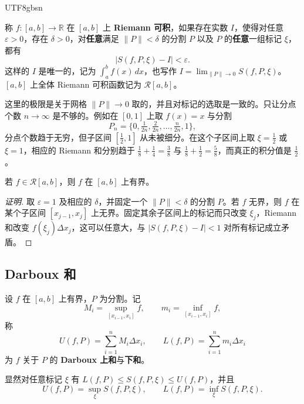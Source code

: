 \documentclass[11pt]{article}
\makeatletter
\newcommand{\envlabel}[1]{\protected@edef\@currentlabel{\themathenv}\label{#1}}
\makeatother
\begin{document}
\begin{CJK*}{UTF8}{gbsn}
\begin{definition}[Riemann 可积]
称 $f:[a,b]\to\mathbb{R}$ 在 $[a,b]$ 上 \textbf{Riemann 可积}，如果存在实数 $I$，使得对任意 $\varepsilon>0$，存在 $\delta>0$，对\textbf{任意}满足 $\|P\|<\delta$ 的分割 $P$ 以及 $P$ 的\textbf{任意}一组标记 $\xi$，都有
\[
|S(f,P,\xi)-I|<\varepsilon.
\]
这样的 $I$ 是唯一的，记为 $\displaystyle\int_{a}^{b}f(x)\,dx$，也写作 $\displaystyle I=\lim_{\|P\|\to0}S(f,P,\xi)$。$[a,b]$ 上全体 Riemann 可积函数记为 $\mathcal{R}[a,b]$。
\end{definition}

\begin{remark}
这里的极限是关于网格 $\|P\|\to0$ 取的，并且对标记的选取是一致的。只让分点个数 $n\to\infty$ 是不够的。例如在 $[0,1]$ 上取 $f(x)=x$ 与分割
\[
P_{n}=\Big\{0,\tfrac{1}{2n},\tfrac{2}{2n},\ldots,\tfrac{n}{2n},1\Big\},
\]
分点个数趋于无穷，但子区间 $[\tfrac12,1]$ 从未被细分。在这个子区间上取 $\xi=\tfrac12$ 或 $\xi=1$，相应的 Riemann 和分别趋于 $\tfrac18+\tfrac14=\tfrac38$ 与 $\tfrac18+\tfrac12=\tfrac58$，而真正的积分值是 $\tfrac12$。
\end{remark}

\begin{proposition}\envlabel{zh:prop:bdd}
若 $f\in\mathcal{R}[a,b]$，则 $f$ 在 $[a,b]$ 上有界。
\end{proposition}

\begin{proof}[证明]
取 $\varepsilon=1$ 及相应的 $\delta$，并固定一个 $\|P\|<\delta$ 的分割 $P$。若 $f$ 无界，则 $f$ 在某个子区间 $[x_{j-1},x_{j}]$ 上无界。固定其余子区间上的标记而只改变 $\xi_{j}$，Riemann 和改变 $f(\xi_{j})\Delta x_{j}$，这可以任意大，与 $|S(f,P,\xi)-I|<1$ 对所有标记成立矛盾。
\end{proof}

\subsection{Darboux 和}

\begin{definition}[Darboux 和]
设 $f$ 在 $[a,b]$ 上有界，$P$ 为分割。记
\[
M_{i}=\sup_{[x_{i-1},x_{i}]}f,\qquad m_{i}=\inf_{[x_{i-1},x_{i}]}f,
\]
称
\[
U(f,P)=\sum_{i=1}^{n}M_{i}\Delta x_{i},\qquad L(f,P)=\sum_{i=1}^{n}m_{i}\Delta x_{i}
\]
为 $f$ 关于 $P$ 的 \textbf{Darboux 上和}与\textbf{下和}。
\end{definition}

显然对任意标记 $\xi$ 有 $L(f,P)\leq S(f,P,\xi)\leq U(f,P)$，并且
\[
U(f,P)=\sup_{\xi}S(f,P,\xi),\qquad L(f,P)=\inf_{\xi}S(f,P,\xi).
\]


\end{CJK*}
\end{document}
